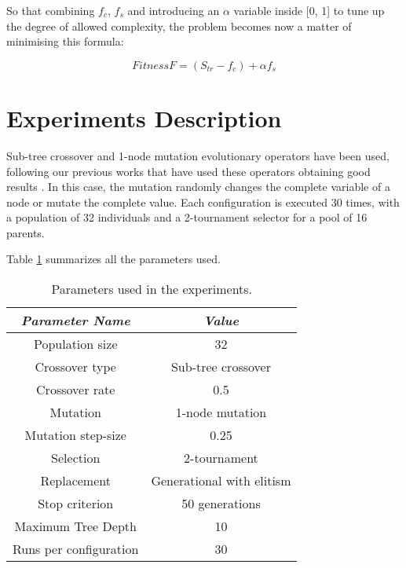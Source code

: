 \documentclass[a4paper,10pt,twocolumn,preprint,3p]{elsarticle}
\begin{document}
So that combining $f_{c}$, $f_{s}$ and introducing an $\alpha$ variable inside [0, 1] to tune up the degree of allowed complexity, the problem becomes now a matter of minimising this formula:

\begin{equation}
\label{eq:complexFitness}
Fitness F = (S_{tr} - f_{c}) + \alpha f_{s}
\end{equation}

\section{Experiments Description}
\label{sec:experiments}

Sub-tree crossover and 1-node mutation evolutionary operators have been used, following our previous works that have used these operators obtaining good results \cite{EvoStar2014:GPBot}. In this case, the mutation randomly changes the complete variable of a node or mutate the complete value. Each configuration is executed 30 times, with a population of 32 individuals and a 2-tournament selector for a pool of 16 parents.


Table \ref{tab:parameters} summarizes all the parameters used.

\begin{table}
\begin{center}
\begin{tabular}{|c|c|}
\hline
{\em Parameter Name} & {\em Value} \\\hline
Population size & 32 \\\hline
Crossover type & Sub-tree crossover \\ \hline
Crossover rate & 0.5\\ \hline
Mutation  & 1-node mutation\\ \hline
Mutation step-size & 0.25 \\ \hline
Selection & 2-tournament \\ \hline
Replacement & Generational with elitism\\ \hline
Stop criterion & 50 generations \\ \hline
Maximum Tree Depth & 10 \\ \hline %
Runs per configuration & 30 \\ \hline
\end{tabular}
\caption{Parameters used in the experiments.}
\label{tab:parameters}
\end{center}
\end{table}
\end{document}
